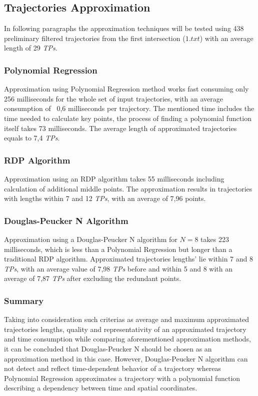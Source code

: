 \subsection{Trajectories Approximation}

In following paragraphs the approximation techniques will be tested using 438 preliminary filtered trajectories from the first intersection ($1.txt$) with an average length of 29 \textit{TPs}.

\subsubsection{Polynomial Regression}

Approximation using Polynomial Regression method works fast consuming only 256 milliseconds for the whole set of input trajectories, with an average consumption of ~0,6 milliseconds per trajectory. The mentioned time includes the time needed to calculate key points, the process of finding a polynomial function itself takes 73 milliseconds. The average length of approximated trajectories equals to 7,4 \textit{TPs}.

\subsubsection{RDP Algorithm}

Approximation using an RDP algorithm takes 55 milliseconds including calculation of additional middle points. The approximation results in trajectories with lengths within 7 and 12 \textit{TPs}, with an average of 7,96 points.

\subsubsection{Douglas-Peucker N Algorithm}

Approximation using a Douglas-Peucker N algorithm for $N = 8$ takes 223 milliseconds, which is less than a Polynomial Regression but longer than a traditional RDP algorithm. Approximated trajectories lengths' lie within 7 and 8 \textit{TPs}, with an average value of 7,98 \textit{TPs} before and within 5 and 8 with an average of 7,87 \textit{TPs} after excluding the redundant points.

\subsubsection{Summary}

Taking into consideration such criterias as average and maximum approximated trajectories lengths, quality and representativity of an approximated trajectory and time consumption while comparing aforementioned approximation methods, it can be concluded that Douglas-Peucker N should be chosen as an approximation method in this case. However, Douglas-Peucker N algorithm can not detect and reflect time-dependent behavior of a trajectory whereas Polynomial Regression approximates a trajectory with a polynomial function describing a dependency between time and spatial coordinates. 

